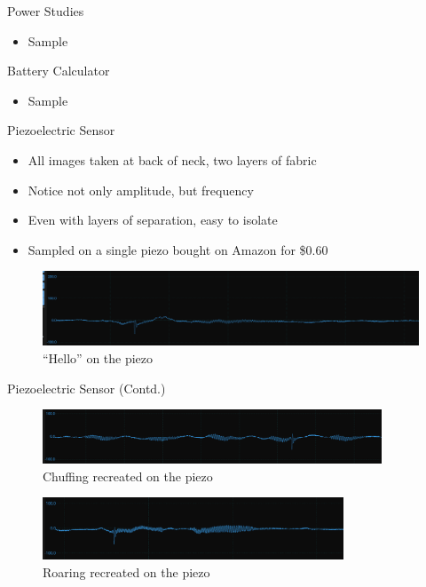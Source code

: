 \begin{frame}{Power Studies}
    \begin{itemize}
        \item Sample
    \end{itemize}
\end{frame}

\begin{frame}{Battery Calculator}
    \begin{itemize}
        \item Sample
    \end{itemize}
\end{frame}

\begin{frame}{Piezoelectric Sensor}
    \begin{itemize}
        \item All images taken at back of neck, two layers of fabric
        \item Notice not only amplitude, but frequency
        \item Even with layers of separation, easy to isolate
        \item Sampled on a single piezo bought on Amazon for \$0.60
    \end{itemize}
    \hspace{10pt}
    \begin{figure}
        \centering
        \includegraphics[height=0.8\textheight,width=1\textwidth,keepaspectratio]{images/piezo_hello_muffled.png}
        \caption{``Hello'' on the piezo}
    \end{figure}
\end{frame}

\begin{frame}{Piezoelectric Sensor (Contd.)}
    \begin{figure}
        \centering
        \includegraphics[height=0.5\textheight,width=0.9\textwidth,keepaspectratio]{images/piezo_chuffing_muffled.png}
        \caption{Chuffing recreated on the piezo}
    \end{figure}
    \begin{figure}
        \centering
        \includegraphics[height=0.5\textheight,width=0.8\textwidth,keepaspectratio]{images/piezo_roar_muffled.png}
        \caption{Roaring recreated on the piezo}
    \end{figure}
\end{frame}

